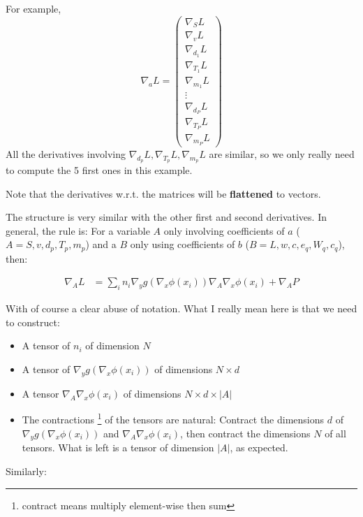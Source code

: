 \documentclass{article}
\theoremstyle{definition}
\theoremstyle{remark}
\newcommand{\1}{\mathbbm{1}}
\begin{document}
For example,
\[
\nabla_a L = \begin{pmatrix}
\nabla_S L \\
\nabla_v L \\
\nabla_{d_1} L \\
\nabla_{T_1} L \\
\nabla_{m_1} L \\
\vdots \\
\nabla_{d_P} L \\
\nabla_{T_P} L \\
\nabla_{m_P} L
\end{pmatrix}
\]
All the derivatives involving $\nabla_{d_p} L, \nabla_{T_p} L, \nabla_{m_p} L$ are similar, so we only really need to compute the 5 first ones in this example.

Note that the derivatives w.r.t. the matrices will be \textbf{flattened} to vectors.

The structure is very similar with the other first and second derivatives. In general, the rule is: For a variable $A$ only involving coefficients of $a$ ( $A=S,v,d_p,T_p,m_p$) and a $B$ only using coefficients of $b$ ($B=L,w,c,e_q,W_q,c_q$), then:

\begin{align*}
\nabla_{A} L &= \sum_i n_i \nabla_y g(\nabla_x \phi(x_i)) \nabla_{A} \nabla_x \phi(x_i) + \nabla_{A} P
\end{align*}

With of course a clear abuse of notation. What I really mean here is that we need to construct:
\begin{itemize}
\item A tensor of $n_i$ of dimension $N$
\item A tensor of $\nabla_y g(\nabla_x \phi(x_i))$ of dimensions $N \times d$
\item A tensor $\nabla_{A} \nabla_x \phi(x_i)$ of dimensions $N \times d \times |A|$
\item The contractions \footnote{contract means multiply element-wise then sum} of the tensors are natural: Contract the dimensions $d$ of $\nabla_y g(\nabla_x \phi(x_i))$ and $\nabla_{A} \nabla_x \phi(x_i)$, then contract the dimensions $N$ of all tensors. What is left is a tensor of dimension $|A|$, as expected.

\end{itemize}

Similarly:
\end{document}
